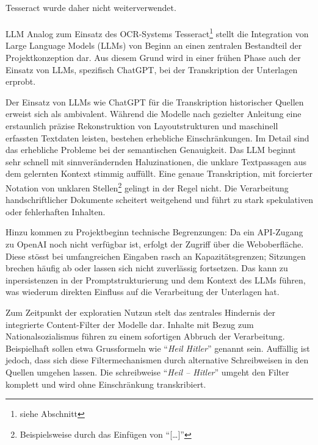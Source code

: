 \documentclass[12pt, a4paper, ngerman, bidi=default]{article}
\makeatletter
\let\oldparagraph\paragraph%
\renewcommand{\paragraph}{
    \@ifstar%
      \xxxParagraphStar%
      \xxxParagraphNoStar%
 }
\newcommand{\xxxParagraphStar}[1]{\oldparagraph*{#1}\mbox{}}
\newcommand{\xxxParagraphNoStar}[1]{\oldparagraph{#1}\mbox{}}
\makeatother
\begin{document}
Tesseract wurde daher nicht weiterverwendet.

\paragraph{LLM}\label{paragraph:LLM_transcript}
Analog zum Einsatz des OCR-Systems Tesseract\footnote{siehe Abschnitt } stellt die Integration von Large Language Models (LLMs) von Beginn an einen zentralen Bestandteil der Projektkonzeption dar.
Aus diesem Grund wird in einer frühen Phase auch der Einsatz von LLMs, spezifisch ChatGPT, bei der Transkription der Unterlagen erprobt.

Der Einsatz von LLMs wie ChatGPT für die Transkription historischer Quellen erweist sich als ambivalent. Während die Modelle nach gezielter 
Anleitung eine erstaunlich präzise Rekonstruktion von Layoutstrukturen und maschinell erfassten Textdaten leisten, bestehen erhebliche Einschränkungen. Im Detail sind das
erhebliche Probleme bei der semantischen Genauigkeit. Das LLM beginnt sehr schnell mit sinnverändernden Haluzinationen, die unklare Textpassagen aus dem gelernten Kontext stimmig auffüllt.
Eine genaue Transkription, mit forcierter Notation von unklaren Stellen\footnote{Beispielsweise durch das Einfügen von \enquote{[\dots]}} gelingt in der Regel nicht. 
Die Verarbeitung handschriftlicher Dokumente scheitert weitgehend und führt zu stark spekulativen oder fehlerhaften Inhalten.

Hinzu kommen zu Projektbeginn technische Begrenzungen: Da ein API-Zugang zu OpenAI noch nicht verfügbar ist, erfolgt der Zugriff 
über die Weboberfläche. Diese stösst bei umfangreichen Eingaben rasch an Kapazitätsgrenzen; 
Sitzungen brechen häufig ab oder lassen sich nicht zuverlässig fortsetzen. Das kann zu inpersistenzen in der Promptstrukturierung und
dem Kontext des LLMs führen, was wiederum direkten Einfluss auf die Verarbeitung der Unterlagen hat.

Zum Zeitpunkt der exploratien Nutzun stelt das zentrales Hindernis der integrierte Content-Filter der Modelle dar. Inhalte mit Bezug zum Nationalsozialismus
führen zu einem sofortigen Abbruch der Verarbeitung. Beispielhaft sollen etwa Grussformeln wie \enquote{\textit{Heil Hitler}} genannt sein. Auffällig ist jedoch, dass
sich diese Filtermechanismen durch alternative Schreibweisen in den Quellen umgehen lassen. Die schreibweise \enquote{\textit{Heil -- Hitler}} umgeht den Filter komplett 
und wird ohne Einschränkung transkribiert.
\end{document}
